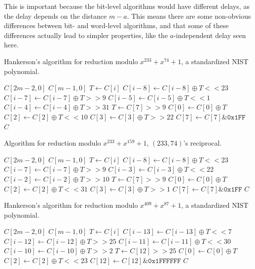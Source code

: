 This is important because the bit-level algorithms would have different delays, as the delay depends on the distance $m-a$. This means there are some non-obvious differences between bit- and word-level algorithms, and that some of these differences actually lead to simpler properties, like the $a$-independent delay seen here. \\

\begin{algorithm}
  \caption{Hankerson's algorithm for reduction modulo $x^{233} + x^{74} + 1$, a standardized NIST polynomial.}
  \label{alg:233_74_nist}
\begin{algorithmic}[1]
  \REQUIRE $C[2m-2,0]$
  \ENSURE $C[m-1,0]$
    \STATE $T \gets C[i]$
    \STATE $C[i-8] \gets C[i-8] \oplus T << 23$
    \STATE $C[i-7] \gets C[i-7] \oplus T >> 9$
    \STATE $C[i-5] \gets C[i-5] \oplus T << 1$
    \STATE $C[i-4] \gets C[i-4] \oplus T >> 31$
  \ENDFOR
  \STATE $T \gets C[7] >> 9$
  \STATE $C[0] \gets C[0] \oplus T$
  \STATE $C[2] \gets C[2] \oplus T << 10$
  \STATE $C[3] \gets C[3] \oplus T >> 22$
  \STATE $C[7] \gets C[7] \& \texttt{0x1FF}$
  \RETURN $C$
\end{algorithmic}
\end{algorithm}

 \begin{algorithm}
  \caption{Algorithm for reduction modulo $x^{233} + x^{159} + 1$, $(233, 74)$'s reciprocal.}
  \label{alg:233_159}
 \begin{algorithmic}[1]
  \REQUIRE $C[2m-2,0]$
  \ENSURE $C[m-1,0]$
    \STATE $T \gets C[i]$
    \STATE $C[i-8] \gets C[i-8] \oplus T << 23$
    \STATE $C[i-7] \gets C[i-7] \oplus T >> 9$
    \STATE $C[i-3] \gets C[i-3] \oplus T << 22$
    \STATE $C[i-2] \gets C[i-2] \oplus T >> 10$
  \ENDFOR
  \STATE $T \gets C[7] >> 9$
  \STATE $C[0] \gets C[0] \oplus T$
  \STATE $C[2] \gets C[2] \oplus T << 31$
  \STATE $C[3] \gets C[3] \oplus T >> 1$
  \STATE $C[7] \gets C[7] \& \texttt{0x1FF}$
  \RETURN $C$
\end{algorithmic}
\end{algorithm}

\begin{algorithm}
  \caption{Hankerson's algorithm for reduction modulo $x^{409} + x^{87} + 1$, a standardized NIST polynomial.}
  \label{alg:409_87_nist}
\begin{algorithmic}[1]
  \REQUIRE $C[2m-2,0]$
  \ENSURE $C[m-1,0]$
    \STATE $T \gets C[i]$
    \STATE $C[i-13] \gets C[i-13] \oplus T << 7$
    \STATE $C[i-12] \gets C[i-12] \oplus T >> 25$
    \STATE $C[i-11] \gets C[i-11] \oplus T << 30$
    \STATE $C[i-10] \gets C[i-10] \oplus T >> 2$
  \ENDFOR
  \STATE $T \gets C[12] >> 25$
  \STATE $C[0] \gets C[0] \oplus T$
  \STATE $C[2] \gets C[2] \oplus T << 23$
  \STATE $C[12] \gets C[12] \& \texttt{0x1FFFFFF}$
  \RETURN $C$
\end{algorithmic}
\end{algorithm}


